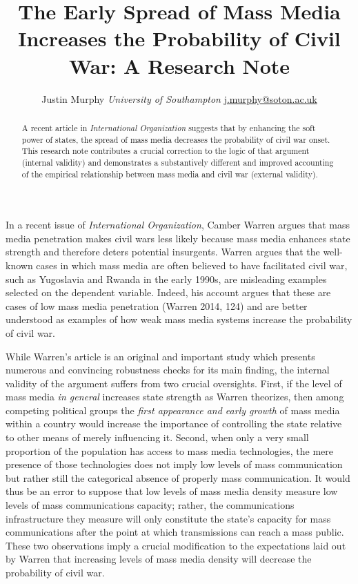 \documentclass[11pt,article,oneside]{memoir}
\title{The Early Spread of Mass Media Increases the Probability of Civil War: A
Research Note}
\author{\Large Justin Murphy\vspace{0.05in} \newline\normalsize\emph{University of Southampton} \newline\footnotesize \url{j.murphy@soton.ac.uk}\vspace*{0.2in}\newline }
\date{}
\begin{document}
  
\setsansfont[Mapping=tex-text]{Gill Sans} 
\setmonofont[Mapping=tex-text,Scale=0.8]{Consolas}

\doublespacing


\maketitle



\vspace{-4ex}
\begin{abstract}

\noindent A recent article in \emph{International Organization} suggests that by
enhancing the soft power of states, the spread of mass media decreases
the probability of civil war onset. This research note contributes a
crucial correction to the logic of that argument (internal validity) and
demonstrates a substantively different and improved accounting of the
empirical relationship between mass media and civil war (external
validity).

\end{abstract}

\newpage


In a recent issue of \emph{International Organization}, Camber Warren
argues that mass media penetration makes civil wars less likely because
mass media enhances state strength and therefore deters potential
insurgents. Warren argues that the well-known cases in which mass media
are often believed to have facilitated civil war, such as Yugoslavia and
Rwanda in the early 1990s, are misleading examples selected on the
dependent variable. Indeed, his account argues that these are cases of
low mass media penetration (Warren 2014, 124) and are better understood
as examples of how weak mass media systems increase the probability of
civil war.

While Warren's article is an original and important study which presents
numerous and convincing robustness checks for its main finding, the
internal validity of the argument suffers from two crucial oversights.
First, if the level of mass media \emph{in general} increases state
strength as Warren theorizes, then among competing political groups the
\emph{first appearance and early growth} of mass media within a country
would increase the importance of controlling the state relative to other
means of merely influencing it. Second, when only a very small
proportion of the population has access to mass media technologies, the
mere presence of those technologies does not imply low levels of mass
communication but rather still the categorical absence of properly mass
communication. It would thus be an error to suppose that low levels of
mass media density measure low levels of mass communications capacity;
rather, the communications infrastructure they measure will only
constitute the state's capacity for mass communications after the point
at which transmissions can reach a mass public. These two observations
imply a crucial modification to the expectations laid out by Warren that
increasing levels of mass media density will decrease the probability of
civil war.
\end{document}
